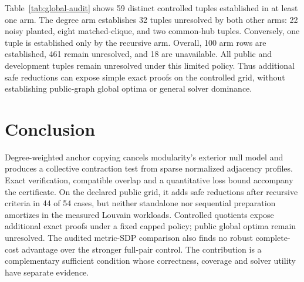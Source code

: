 \documentclass[sigconf,anonymous,review]{acmart}
\newcommand{\1}{\mathbf{1}}
\begin{document}
Table~\ref{tab:global-audit} shows 59 distinct controlled tuples established
in at least one arm. The degree arm establishes 32 tuples unresolved by both
other arms: 22 noisy planted, eight matched-clique, and two common-hub tuples.
Conversely, one tuple is established only by the recursive arm. Overall, 100
arm rows are established, 461 remain unresolved, and 18 are unavailable.
All public and development tuples remain unresolved under this limited policy.
Thus additional safe reductions can expose simple exact proofs on the controlled
grid, without establishing public-graph global optima or general solver dominance.

\section{Conclusion}
Degree-weighted anchor copying cancels modularity's exterior null model and
produces a collective contraction test from sparse normalized adjacency
profiles. Exact verification, compatible overlap and a quantitative loss
bound accompany the certificate. On the declared public grid, it adds safe
reductions after recursive criteria in 44 of 54 cases, but neither standalone
nor sequential preparation amortizes in the measured Louvain workloads.
Controlled quotients expose additional exact proofs under a fixed capped
policy; public global optima remain unresolved. The audited metric-SDP
comparison also finds no robust complete-cost advantage over the stronger
full-pair control. The contribution is a complementary sufficient condition
whose correctness, coverage and solver utility have separate evidence.
\end{document}
